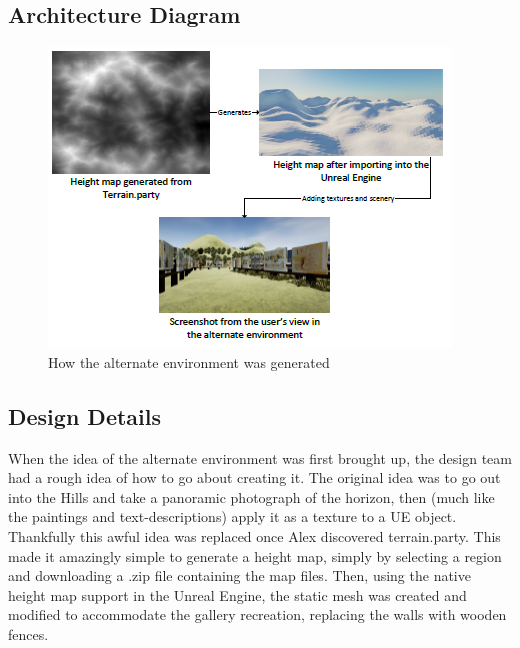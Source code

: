 \subsection{Architecture Diagram}
\begin{figure}
\includegraphics[scale=1.0]{Diagrams/AltEnvironment.png}
\centering
\caption{How the alternate environment was generated}
\end{figure}

\subsection{Design Details}
When the idea of the alternate environment was first brought up, the design team had a rough idea of how to go about creating it.  The original idea was to go out into the Hills and take a panoramic photograph of the horizon, then (much like the paintings and text-descriptions) apply it as a texture to a UE object.  Thankfully this awful idea was replaced once Alex discovered terrain.party.  This made it amazingly simple to generate a height map, simply by selecting a region and downloading a .zip file containing the map files.  Then, using the native height map support in the Unreal Engine, the static mesh was created and modified to accommodate the gallery recreation, replacing the walls with wooden fences.

